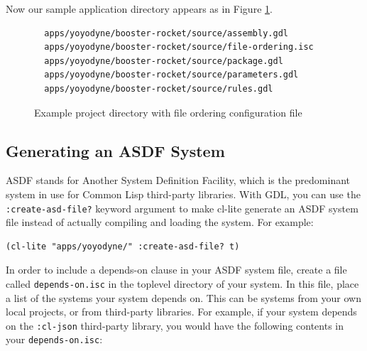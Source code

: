 \documentclass [11pt]{book}
\begin{document}
Now our sample application directory appears as in
	Figure 
\ref{fig:yoyodyne-with-file-ordering-isc}.


\begin{figure}
\begin{lrbox}{\boxedverb}
\begin{minipage}{\linewidth}

\begin{verbatim}
  apps/yoyodyne/booster-rocket/source/assembly.gdl
  apps/yoyodyne/booster-rocket/source/file-ordering.isc
  apps/yoyodyne/booster-rocket/source/package.gdl
  apps/yoyodyne/booster-rocket/source/parameters.gdl
  apps/yoyodyne/booster-rocket/source/rules.gdl
\end{verbatim}
\end{minipage}
\end{lrbox}
\fbox{\usebox{\boxedverb}}

\caption{Example project directory with file ordering configuration file}

\label{fig:yoyodyne-with-file-ordering-isc}

\end{figure}


\subsection{Generating an ASDF System}

\label{subsec:generatinganasdfsystem}



ASDF stands for Another System Definition Facility, which
	is the predominant system in use for Common Lisp third-party
	libraries. With GDL, you can use the \texttt{:create-asd-file?} keyword argument to make cl-lite generate an ASDF system
file instead of actually compiling and loading the system. For example: 

\begin{verbatim}(cl-lite "apps/yoyodyne/" :create-asd-file? t)
\end{verbatim}



In order to include a depends-on clause in your ASDF system file, create a file called \texttt{depends-on.isc} in the toplevel directory of your system. In this file,
place a list of the systems your system depends on. This can be
systems from your own local projects, or from third-party libraries.
For example, if your system depends on the \texttt{:cl-json} third-party library, you would have the following contents in your \texttt{depends-on.isc}: 
\end{document}

